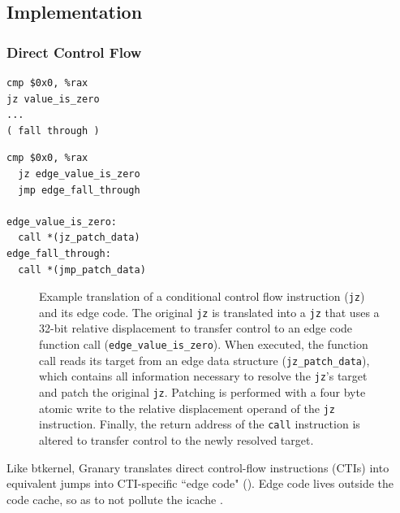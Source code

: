 \documentclass[preprint]{sigplanconf}
\begin{document}
\subsection{Implementation}
\subsubsection{Direct Control Flow}
\lstset{language=[x64]Assembler}
\newsavebox\nativejcc
\begin{lrbox}{\nativejcc}
\begin{minipage}[b]{4cm}
\begin{lstlisting}[basicstyle=\footnotesize\ttfamily]
cmp $0x0, %rax
jz value_is_zero 
...
( fall through )
\end{lstlisting}
\end{minipage}
\end{lrbox}

\newsavebox\translatedjcc
\begin{lrbox}{\translatedjcc}\begin{minipage}[b]{4cm}\begin{lstlisting}[basicstyle=\footnotesize\ttfamily]
  cmp $0x0, %rax
  jz edge_value_is_zero
  jmp edge_fall_through

edge_value_is_zero:
  call *(jz_patch_data)
edge_fall_through:
  call *(jmp_patch_data)
\end{lstlisting}
\end{minipage}
\end{lrbox}

\begin{figure}[t!]
\hfill
{}
\caption{\label{fig:direct_edge_code}Example translation of a conditional control flow instruction (\texttt{jz}) and its edge code. The original \texttt{jz} is translated into a \texttt{jz} that uses a 32-bit relative displacement to transfer control to an edge code function call (\texttt{edge\_value\_is\_zero}). When executed, the function call reads its target from an edge data structure (\texttt{jz\_patch\_data}), which contains all information necessary to resolve the \texttt{jz}'s target and patch the original \texttt{jz}. Patching is performed with a four byte atomic write to the relative displacement operand of the \texttt{jz} instruction. Finally, the return address of the \texttt{call} instruction is altered to transfer control to the newly resolved target.}
\end{figure}
Like btkernel, Granary translates direct control-flow instructions (CTIs) into equivalent jumps into CTI-specific ``edge code" (). Edge code lives outside the code cache, so as to not pollute the icache \cite{btkernel}.
\end{document}
